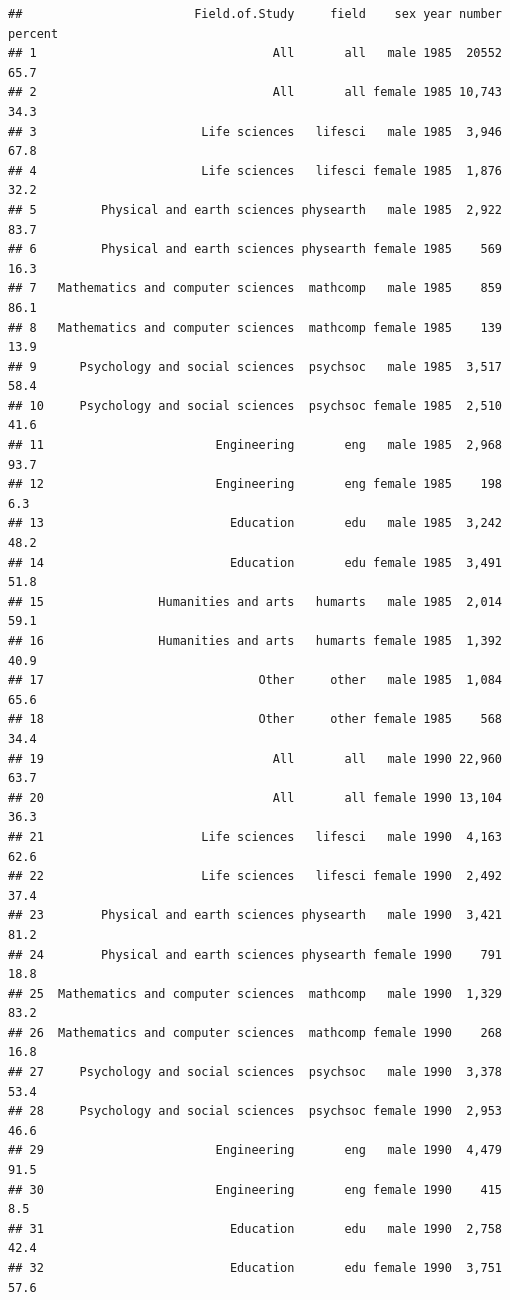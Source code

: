 \documentclass[]{article}
\begin{document}
\begin{verbatim}
##                        Field.of.Study     field    sex year number percent
## 1                                 All       all   male 1985  20552    65.7
## 2                                 All       all female 1985 10,743    34.3
## 3                       Life sciences   lifesci   male 1985  3,946    67.8
## 4                       Life sciences   lifesci female 1985  1,876    32.2
## 5         Physical and earth sciences physearth   male 1985  2,922    83.7
## 6         Physical and earth sciences physearth female 1985    569    16.3
## 7   Mathematics and computer sciences  mathcomp   male 1985    859    86.1
## 8   Mathematics and computer sciences  mathcomp female 1985    139    13.9
## 9      Psychology and social sciences  psychsoc   male 1985  3,517    58.4
## 10     Psychology and social sciences  psychsoc female 1985  2,510    41.6
## 11                        Engineering       eng   male 1985  2,968    93.7
## 12                        Engineering       eng female 1985    198     6.3
## 13                          Education       edu   male 1985  3,242    48.2
## 14                          Education       edu female 1985  3,491    51.8
## 15                Humanities and arts   humarts   male 1985  2,014    59.1
## 16                Humanities and arts   humarts female 1985  1,392    40.9
## 17                              Other     other   male 1985  1,084    65.6
## 18                              Other     other female 1985    568    34.4
## 19                                All       all   male 1990 22,960    63.7
## 20                                All       all female 1990 13,104    36.3
## 21                      Life sciences   lifesci   male 1990  4,163    62.6
## 22                      Life sciences   lifesci female 1990  2,492    37.4
## 23        Physical and earth sciences physearth   male 1990  3,421    81.2
## 24        Physical and earth sciences physearth female 1990    791    18.8
## 25  Mathematics and computer sciences  mathcomp   male 1990  1,329    83.2
## 26  Mathematics and computer sciences  mathcomp female 1990    268    16.8
## 27     Psychology and social sciences  psychsoc   male 1990  3,378    53.4
## 28     Psychology and social sciences  psychsoc female 1990  2,953    46.6
## 29                        Engineering       eng   male 1990  4,479    91.5
## 30                        Engineering       eng female 1990    415     8.5
## 31                          Education       edu   male 1990  2,758    42.4
## 32                          Education       edu female 1990  3,751    57.6

\end{verbatim}
\end{document}

